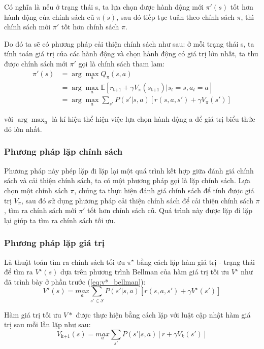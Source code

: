 \documentclass{uetgraduation}
\begin{document}
Có nghĩa là nếu ở trạng thái s, ta lựa chọn được hành động mới $\pi'(s)$ tốt hơn hành động của chính sách cũ $\pi(s)$, sau đó tiếp tục tuân theo chính sách $\pi$, thì chính sách mới
$\pi'$ tốt hơn chính sách $\pi$.

Do đó ta sẽ có phương pháp cải thiện chính sách như sau: ở mỗi trạng thái s, ta tính toán giá trị của các hành động và chọn hành động có giá trị lớn nhất, ta thu được chính sách mới
$\pi'$ gọi là chính sách tham lam:
\begin{equation}
    \begin{split}
        \pi' (s) &= \arg \max_{a} Q_\pi (s, a) \\
        &= \arg \max_{a} \mathbb{E} [r_\text{t+1} + \gamma V_\pi (s_\text{t+1}) | s_t = s, a_t = a] \\
        &= \arg \max_{a} \sum_{s'} P(s' | s, a) [r(s, a, s') + \gamma V_\pi(s')]
    \end{split}
\end{equation}

với $\arg \max_{a}$ là kí hiệu thể hiện việc lựa chọn hành động a để giá trị biểu thức đó lớn nhất.

\subsubsection{Phương pháp lặp chính sách}
Phương pháp này phép lặp đi lặp lại một quá trình kết hợp giữa đánh giá chính sách và cải thiện chính sách, ta có một phương pháp gọi là lặp chính sách. 
Lựa chọn một chính sách $\pi$, chúng ta thực hiện đánh giá chính sách để tính được giá trị $V_\pi$, sau đó sử dụng phương pháp cải thiện chính sách để cải thiện chính sách 
$\pi$, tìm ra chính sách mới $\pi'$ tốt hơn chính sách cũ. Quá trình này được lặp đi lặp lại giúp ta tìm ra chính sách tối ưu.

\subsubsection{Phương pháp lặp giá trị}
Là thuật toán tìm ra chính sách tối ưu $\pi^\star$ bằng cách lặp hàm giá trị - trạng thái để tìm ra $V^\star (s)$ dựa trên phương trình Bellman của hàm giá trị tối ưu $V^\star$ như đã trình bày
ở phần trước (\ref{eq:v*_bellman}):
\begin{equation}
    V^\star (s) = \underset{a}{max } \sum_{s' \in \mathcal{S}} P(s' | s, a) [r(s, a, s') + \gamma V^\star (s')]
\end{equation}

Hàm giá trị tối ưu $V*$ được thực hiện bằng cách lặp với luật cập nhật hàm giá trị sau mỗi lần lặp như sau:
\begin{equation}
    V_\text{k+1} (s) = \underset{a}{max } \sum_{s'} P(s' | s, a) [r + \gamma V_k (s')]
\end{equation}
\end{document}
